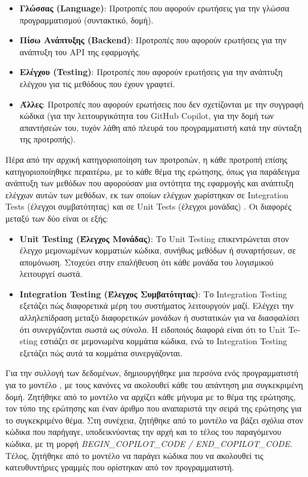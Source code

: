 \begin{itemize}
  \item
    \textbf{Γλώσσας (\textlatin{Language})}: Προτροπές που αφορούν
    ερωτήσεις για την γλώσσα προγραμματισμού (συντακτικό, δομή).
  \item
    \textbf{Πίσω Ανάπτυξης (\textlatin{Backend})}: Προτροπές που αφορούν
    ερωτήσεις για την ανάπτυξη του \textlatin{API} της εφαρμογής.
  \item
    \textbf{Ελέγχου (\textlatin{Testing})}: Προτροπές που αφορούν
    ερωτήσεις για την ανάπτυξη ελέγχου για τις μεθόδους που έχουν γραφτεί.
  \item
    \textbf{Άλλες}: Προτροπές που αφορούν ερωτήσεις που δεν σχετίζονται με
    την συγγραφή κώδικα (για την λειτουργικότητα του \textlatin{GitHub
      Copilot}, για την δομή των απαντήσεών του, τυχόν λάθη από πλευρά του
    προγραμματιστή κατά την σύνταξη της προτροπής).
\end{itemize}

Πέρα από την αρχική κατηγοριοποίηση των προτροπών, η κάθε προτροπή
επίσης κατηγοριοποίηθηκε περαιτέρω, με το κάθε θέμα της ερώτησης, όπως
για παράδειγμα ανάπτυξη των μεθόδων που αφορούσαν μια οντότητα της
εφαρμογής και ανάπτυξη ελέγχων αυτών των μεθόδων, εκ των οποίων ελέγχων
χωρίστηκαν σε \textlatin{Integration Tests} (έλεγχοι συμβατότητας) και
σε \textlatin{Unit Tests} (έλεγχοι μονάδας) \cite{jamilTesting,
Kathiriya}. Οι διαφορές μεταξύ των δύο είναι οι εξής:
\begin{itemize}
  \item
    \textbf{\textlatin{Unit Testing} (Έλεγχος Μονάδας)}: Το
    \textlatin{Unit Testing} επικεντρώνεται στον έλεγχο μεμονωμένων
    κομματιών κώδικα, συνήθως μεθόδων ή συναρτήσεων, σε απομόνωση.
    Στοχεύει στην επαλήθευση ότι κάθε μονάδα του λογισμικού λειτουργεί
    σωστά.
  \item
    \textbf{\textlatin{Integration Testing} (Έλεγχος Συμβατότητας)}: Το
    \textlatin{Integration Testing} εξετάζει πώς διαφορετικά μέρη του
    συστήματος λειτουργούν μαζί. Ελέγχει την αλληλεπίδραση μεταξύ
    διαφορετικών μονάδων ή συστατικών για να διασφαλίσει ότι συνεργάζονται
    σωστά ως σύνολο. Η ειδοποιός διαφορά είναι ότι το \textlatin{Unit
    Testing} εστιάζει σε μεμονωμένα κομμάτια κώδικα, ενώ το
    \textlatin{Integration Testing} εξετάζει πώς αυτά τα κομμάτια
    συνεργάζονται. \cite{patton2005software}
\end{itemize}

Για την συλλογή των δεδομένων, δημιουργήθηκε μια περσόνα ενός
προγραμματιστή για το μοντέλο \cite{zhou2024sotopia,AitBaha2023,
xu2023expertprompting}, με τους κανόνες να ακολουθεί κάθε του απάντηση
μια συγκεκριμένη δομή. Ζητήθηκε από το μοντέλο να αρχίζει κάθε μήνυμα με
το θέμα της ερώτησης, τον τύπο της ερώτησης και έναν άριθμο που
αναπαριστά την σειρά της ερώτησης για το συγκεκριμένο θέμα. Στη
συνέχεια, ζητήθηκε από το μοντέλο να βάζει σχόλια στον κώδικα που
παρήγαγε, υποδεικνύοντας την αρχή και το τέλος του παραγόμενου κώδικα, με
τη μορφή \textlatin{\textit{BEGIN\_COPILOT\_CODE / END\_COPILOT\_CODE}}.
Τέλος, ζητήθηκε από το μοντέλο να παράγει κώδικα που να ακολουθεί τις
κατευθυντήριες γραμμές που ορίστηκαν από τον προγραμματιστή.

